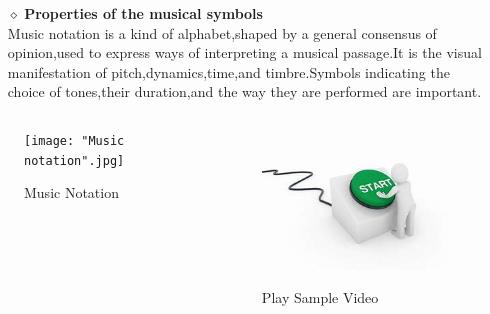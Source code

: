 \documentclass{beamer}
\begin{document}
\begin{frame}
\transboxout

\begin{enumerate}
\item[$\diamond$]{\textbf {Properties of the musical symbols}}\\ \pause
Music notation is a kind of alphabet,shaped by a general consensus of opinion,used to express ways of interpreting a musical passage.It is the visual manifestation of pitch,dynamics,time,and timbre.Symbols indicating the choice of tones,their duration,and the way they are performed are important.\pause
 \end{enumerate}
 \begin{columns}
 \begin{column}{.7\textwidth}
 \begin{figure}
     
     \texttt{[image: "Music notation".jpg]}
     \caption{Music Notation}
 \end{figure}
 \end{column}
 \pause
 \begin{column}{.5\textwidth}
 \begin{figure}
\href{run:ms.mp4}{\includegraphics[width=.5\textwidth]{start.jpg}} 
\caption{Play Sample Video}
\end{figure}
\end{column} 
 \end{columns}
\end{frame}
\end{document}
